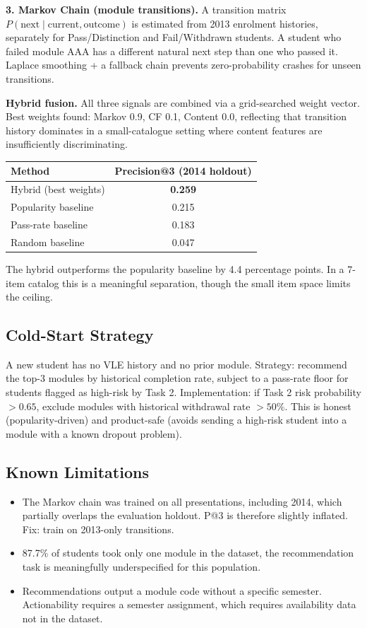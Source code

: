 \documentclass[10pt,a4paper]{article}
\begin{document}
\textbf{3. Markov Chain (module transitions).} A transition matrix $P(\text{next} \mid
\text{current}, \text{outcome})$ is estimated from 2013 enrolment histories, separately
for Pass/Distinction and Fail/Withdrawn students. A student who failed module AAA has a
different natural next step than one who passed it. Laplace smoothing + a fallback chain
prevents zero-probability crashes for unseen transitions.

\textbf{Hybrid fusion.} All three signals are combined via a grid-searched weight vector.
Best weights found: Markov 0.9, CF 0.1, Content 0.0, reflecting that transition history
dominates in a small-catalogue setting where content features are insufficiently
discriminating.

\begin{center}
\small
\begin{tabularx}{0.6\linewidth}{@{}LC@{}}
\toprule
\textbf{Method} & \textbf{Precision@3 (2014 holdout)} \\
\midrule
Hybrid (best weights) & \textbf{0.259} \\
Popularity baseline   & 0.215 \\
Pass-rate baseline    & 0.183 \\
Random baseline       & 0.047 \\
\bottomrule
\end{tabularx}
\end{center}

The hybrid outperforms the popularity baseline by 4.4 percentage points. In a 7-item
catalog this is a meaningful separation, though the small item space limits the ceiling.

\subsection{Cold-Start Strategy} A new student has no VLE history and no prior module.
Strategy: recommend the top-3 modules by historical completion rate, subject to a
pass-rate floor for students flagged as high-risk by Task 2. Implementation: if Task 2
risk probability $> 0.65$, exclude modules with historical withdrawal rate $> 50\%$.
This is honest (popularity-driven) and product-safe (avoids sending a high-risk student
into a module with a known dropout problem).

\subsection{Known Limitations}
\begin{itemize}
  \item The Markov chain was trained on all presentations, including 2014, which partially
    overlaps the evaluation holdout. P@3 is therefore slightly inflated. Fix: train on
    2013-only transitions.
  \item 87.7\% of students took only one module in the dataset, the recommendation task
    is meaningfully underspecified for this population.
  \item Recommendations output a module code without a specific semester. Actionability
    requires a semester assignment, which requires availability data not in the dataset.
\end{itemize}
\end{document}
